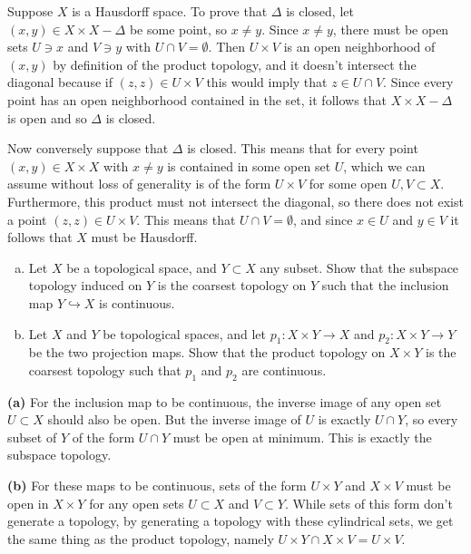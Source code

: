 \documentclass[11pt,letterpaper]{article}
\begin{document}
\begin{changemargin}{1em}{1em}
    Suppose $X$ is a Hausdorff space. To prove that $\Delta$ is closed, let $(x,y)\in X\times X-\Delta$ be some point, so $x\neq y$. Since $x\neq y$, there must be open sets $U\ni x$ and $V\ni y$ with $U\cap V=\emptyset$. Then $U\times V$ is an open neighborhood of $(x,y)$ by definition of the product topology, and it doesn't intersect the diagonal because if $(z,z)\in U\times V$ this would imply that $z\in U\cap V$. Since every point has an open neighborhood contained in the set, it follows that $X\times X-\Delta$ is open and so $\Delta$ is closed.

    Now conversely suppose that $\Delta$ is closed. This means that for every point $(x,y)\in X\times X$ with $x\neq y$ is contained in some open set $U$, which we can assume without loss of generality is of the form $U\times V$ for some open $U,V\subset X$. Furthermore, this product must not intersect the diagonal, so there does not exist a point $(z,z)\in U\times V$. This means that $U\cap V = \emptyset$, and since $x\in U$ and $y\in V$ it follows that $X$ must be Hausdorff.         
\end{changemargin}

\begin{problem}\noindent
    \begin{enumerate}[(a)]
        \item Let $X$ be a topological space, and $Y \subset X$ any subset. Show that the subspace topology induced on $Y$ is the coarsest topology on $Y$ such that the inclusion map $Y \hookrightarrow X$ is continuous.
        \item Let $X$ and $Y$ be topological spaces, and let $p_1 : X\times Y \to X$ and $p_2 : X\times Y \to Y$ be the two projection maps. Show that the product topology on $X\times Y$ is the coarsest topology such that $p_1$ and $p_2$ are continuous.
    \end{enumerate}
\end{problem}

\begin{changemargin}{1em}{1em}
    \textbf{(a)} For the inclusion map to be continuous, the inverse image of any open set $U\subset X$ should also be open. But the inverse image of $U$ is exactly $U\cap Y$, so every subset of $Y$ of the form $U\cap Y$ must be open at minimum. This is exactly the subspace topology.

    \textbf{(b)} For these maps to be continuous, sets of the form $U\times Y$ and $X\times V$ must be open in $X\times Y$ for any open sets $U\subset X$ and $V\subset Y$. While sets of this form don't generate a topology, by generating a topology with these cylindrical sets, we get the same thing as the product topology, namely $U\times Y\cap X\times V = U\times V$.   
\end{changemargin}
\end{document}

